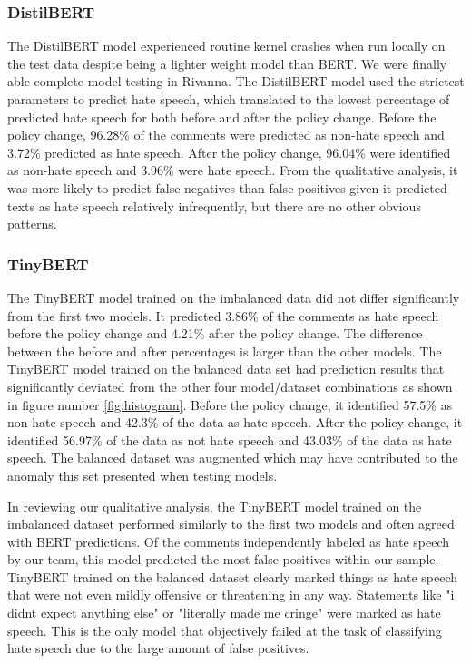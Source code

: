 \documentclass[conference]{IEEEtran}
\begin{document}
\subsubsection{DistilBERT}
The DistilBERT model experienced routine kernel crashes when run locally on the test data despite being a lighter weight model than BERT. We were finally able complete model testing in Rivanna. The DistilBERT model used the strictest parameters to predict hate speech, which translated to the lowest percentage of predicted hate speech for both before and after the policy change. Before the policy change, 96.28\% of the comments were predicted as non-hate speech and 3.72\% predicted as hate speech. After the policy change, 96.04\% were identified as non-hate speech and 3.96\% were hate speech. From the qualitative analysis, it was more likely to predict false negatives than false positives given it predicted texts as hate speech relatively infrequently, but there are no other obvious patterns. 

\subsubsection{TinyBERT}
The TinyBERT model trained on the imbalanced data did not differ significantly from the first two models. It predicted 3.86\% of the comments as hate speech before the policy change and 4.21\% after the policy change. The difference between the before and after percentages is larger than the other models. The TinyBERT model trained on the balanced data set had prediction results that significantly deviated from the other four model/dataset combinations as shown in figure number \ref{fig:histogram}. Before the policy change, it identified 57.5\% as non-hate speech and 42.3\% of the data as hate speech. After the policy change, it identified 56.97\% of the data as not hate speech and 43.03\% of the data as hate speech. The balanced dataset was augmented which may have contributed to the anomaly this set presented when testing models.

In reviewing our qualitative analysis, the TinyBERT model trained on the imbalanced dataset performed similarly to the first two models and often agreed with BERT predictions. Of the comments independently labeled as hate speech by our team, this model predicted the most false positives within our sample. TinyBERT trained on the balanced dataset clearly marked things as hate speech that were not even mildly offensive or threatening in any way. Statements like "i didnt expect anything else" or "literally made me cringe" were marked as hate speech. This is the only model that objectively failed at the task of classifying hate speech due to the large amount of false positives.  
\end{document}
